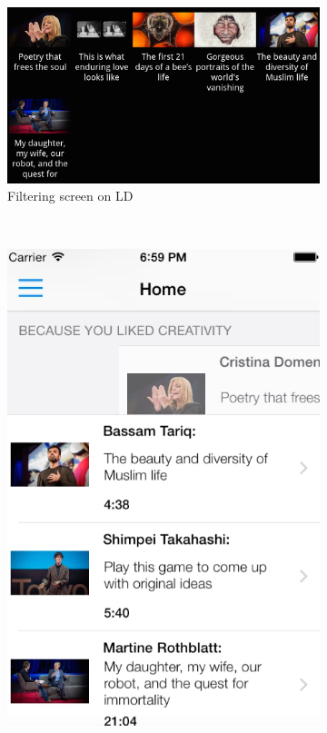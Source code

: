 \begin{figure}
    \centering
    \begin{subfigure}[b]{0.6\textwidth}
        \includegraphics[width=\textwidth]{filterLD}
        \caption{Filtering screen on LD}
        \label{fig:figure47a}
    \end{subfigure}
    ~ %
    \begin{subfigure}[b]{0.3\textwidth}
        \includegraphics[width=\textwidth]{swiperightSD}

\end{subfigure}
\end{figure}
